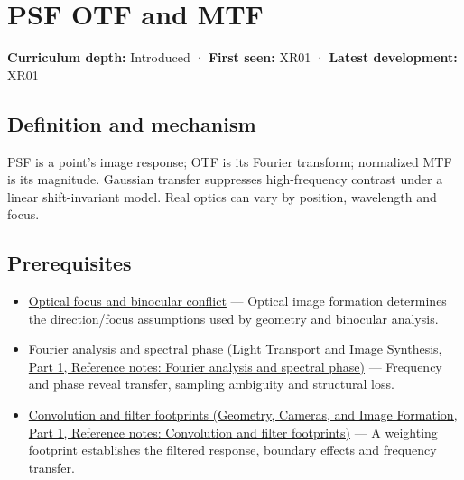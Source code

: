 \hypertarget{appendix-8b76b0efd27f}{}\label{referencestart:appendix-8b76b0efd27f}
\section{PSF OTF and MTF}\label{appendix-8b76b0efd27f-psf-otf-and-mtf}

\hypertarget{appendix-8b76b0efd27f-psf-otf-and-mtf}{}

\textbf{Curriculum depth:} Introduced · \textbf{First seen:} XR01 · \textbf{Latest development:} XR01

\begin{allmightroledefinition}

\subsection{Definition and mechanism}\label{appendix-8b76b0efd27f-definition-and-mechanism}

\hypertarget{appendix-8b76b0efd27f-definition-and-mechanism}{}

PSF is a point's image response; OTF is its Fourier transform; normalized MTF is its magnitude. Gaussian transfer suppresses high-frequency contrast under a linear shift-invariant model. Real optics can vary by position, wavelength and focus.

\end{allmightroledefinition}

\subsection{Prerequisites}\label{appendix-8b76b0efd27f-prerequisites}

\hypertarget{appendix-8b76b0efd27f-prerequisites}{}

\begin{itemize}
\tightlist
\item
  \hyperref[appendix-f90cee1be7a4]{Optical focus and binocular conflict} --- Optical image formation determines the direction/focus assumptions used by geometry and binocular analysis.
\item
  \href{../04-Light-Transport-and-Image-Synthesis-P01/main.pdf\#nameddest=appendix-b60686ba06a1}{Fourier analysis and spectral phase (Light Transport and Image Synthesis, Part 1, Reference notes: Fourier analysis and spectral phase)} --- Frequency and phase reveal transfer, sampling ambiguity and structural loss.
\item
  \href{../03-Geometry-Cameras-and-Image-Formation-P01/main.pdf\#nameddest=appendix-d5b3c692d9f0}{Convolution and filter footprints (Geometry, Cameras, and Image Formation, Part 1, Reference notes: Convolution and filter footprints)} --- A weighting footprint establishes the filtered response, boundary effects and frequency transfer.
\end{itemize}

